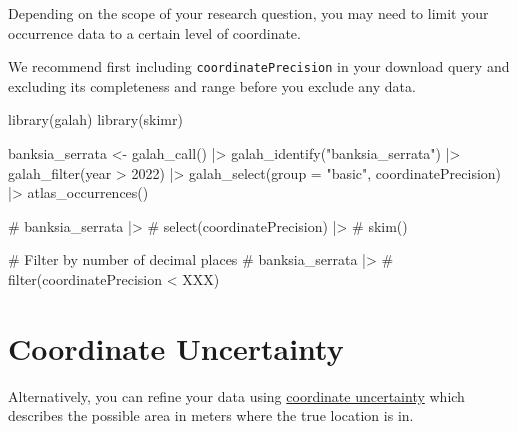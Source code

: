 \documentclass[
  letterpaper,
  DIV=11,
  numbers=noendperiod,
  oneside]{scrreprt}
\newenvironment{Shaded}{\begin{snugshade}}{\end{snugshade}}
\newcommand{\AttributeTok}[1]{\textcolor[rgb]{0.40,0.45,0.13}{#1}}
\newcommand{\CommentTok}[1]{\textcolor[rgb]{0.37,0.37,0.37}{#1}}
\newcommand{\DecValTok}[1]{\textcolor[rgb]{0.68,0.00,0.00}{#1}}
\newcommand{\FunctionTok}[1]{\textcolor[rgb]{0.28,0.35,0.67}{#1}}
\newcommand{\NormalTok}[1]{\textcolor[rgb]{0.00,0.23,0.31}{#1}}
\newcommand{\OtherTok}[1]{\textcolor[rgb]{0.00,0.23,0.31}{#1}}
\newcommand{\SpecialCharTok}[1]{\textcolor[rgb]{0.37,0.37,0.37}{#1}}
\newcommand{\StringTok}[1]{\textcolor[rgb]{0.13,0.47,0.30}{#1}}
\begin{document}
Depending on the scope of your research question, you may need to limit
your occurrence data to a certain level of coordinate.

We recommend first including \texttt{coordinatePrecision} in your
download query and excluding its completeness and range before you
exclude any data.

\begin{Shaded}
\begin{Highlighting}[]
\FunctionTok{library}\NormalTok{(galah)}
\FunctionTok{library}\NormalTok{(skimr)}

\NormalTok{banksia\_serrata }\OtherTok{\textless{}{-}} \FunctionTok{galah\_call}\NormalTok{() }\SpecialCharTok{|\textgreater{}} 
  \FunctionTok{galah\_identify}\NormalTok{(}\StringTok{"banksia\_serrata"}\NormalTok{) }\SpecialCharTok{|\textgreater{}} 
  \FunctionTok{galah\_filter}\NormalTok{(year }\SpecialCharTok{\textgreater{}} \DecValTok{2022}\NormalTok{) }\SpecialCharTok{|\textgreater{}}  
  \FunctionTok{galah\_select}\NormalTok{(}\AttributeTok{group =} \StringTok{"basic"}\NormalTok{, coordinatePrecision) }\SpecialCharTok{|\textgreater{}} 
  \FunctionTok{atlas\_occurrences}\NormalTok{()}

\CommentTok{\# banksia\_serrata |\textgreater{} }
\CommentTok{\#   select(coordinatePrecision) |\textgreater{} }
\CommentTok{\#   skim()}

\CommentTok{\# Filter by number of decimal places}
\CommentTok{\# banksia\_serrata |\textgreater{} }
\CommentTok{\#   filter(coordinatePrecision \textless{} XXX) }
\end{Highlighting}
\end{Shaded}

\hypertarget{coordinate-uncertainty}{%
\section{Coordinate Uncertainty}\label{coordinate-uncertainty}}

Alternatively, you can refine your data using
\href{https://dwc.tdwg.org/terms/\#dwc:coordinateUncertaintyInMeters}{coordinate
uncertainty} which describes the possible area in meters where the true
location is in.
\end{document}

